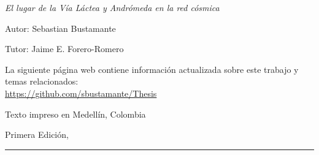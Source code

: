
\thispagestyle{empty}

\hfill

\vfill

\medskip


\noindent
\textit{
El lugar de la Vía Láctea y Andrómeda en la red cósmica
}




Autor: Sebastian Bustamante

Tutor: Jaime E. Forero-Romero



\vfill

\vfill

\noindent
La siguiente página web contiene información actualizada sobre este trabajo y temas relacionados: \\
\url{https://github.com/sbustamante/Thesis}


\noindent
Texto impreso en Medellín, Colombia

\noindent
Primera Edición, 
\monthname \ \the\year

\vspace{1cm}
\hrule
\bigskip

\cleardoublepage

%
%
%
%
%
%

